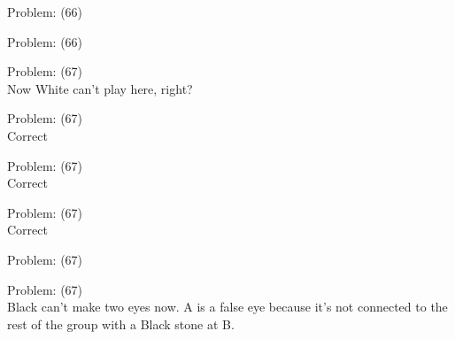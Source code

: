 \documentclass[11pt]{article}
\begin{document}
\begin{minipage}[t]{0.5\textwidth}
  {\centering
  
  Problem: (66)\\
  
  }
\end{minipage}
\begin{minipage}[t]{0.5\textwidth}
  {\centering
  
  Problem: (66)\\
  
  }
\end{minipage}
\begin{minipage}[t]{0.5\textwidth}
  {\centering
  
  Problem: (67)\\
  Now White can't play here, right?\\
  }
\end{minipage}
\begin{minipage}[t]{0.5\textwidth}
  {\centering
  
  Problem: (67)\\
  Correct\\
  }
\end{minipage}
\begin{minipage}[t]{0.5\textwidth}
  {\centering
  
  Problem: (67)\\
  Correct\\
  }
\end{minipage}
\begin{minipage}[t]{0.5\textwidth}
  {\centering
  
  Problem: (67)\\
  Correct\\
  }
\end{minipage}
\begin{minipage}[t]{0.5\textwidth}
  {\centering
  
  Problem: (67)\\
  
  }
\end{minipage}
\begin{minipage}[t]{0.5\textwidth}
  {\centering
  
  Problem: (67)\\
  Black can't make two eyes now. A is a false eye because it's not connected to the rest of the group with a Black stone at B.\\
  }
\end{minipage}
\end{document}
